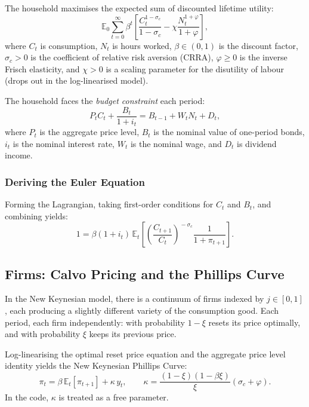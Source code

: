 \documentclass[11pt,a4paper]{article}
\theoremstyle{definition}
\newcommand{\E}{\mathbb{E}}
\begin{document}
	The household maximises the expected sum of discounted lifetime utility:
	\begin{equation}\label{eq:utility}
		\E_0 \sum_{t=0}^{\infty} \beta^t \left[\frac{C_t^{1 - \sigma_c}}{1 - \sigma_c} - \chi \frac{N_t^{1 + \varphi}}{1 + \varphi}\right],
	\end{equation}
	where $C_t$ is consumption, $N_t$ is hours worked, $\beta \in (0,1)$ is the discount factor, $\sigma_c > 0$ is the coefficient of relative risk aversion (CRRA), $\varphi \geq 0$ is the inverse Frisch elasticity, and $\chi > 0$ is a scaling parameter for the disutility of labour (drops out in the log-linearised model).
	
	The household faces the \emph{budget constraint} each period:
	\begin{equation}\label{eq:budget}
		P_t C_t + \frac{B_t}{1 + i_t} = B_{t-1} + W_t N_t + D_t,
	\end{equation}
	where $P_t$ is the aggregate price level, $B_t$ is the nominal value of one-period bonds, $i_t$ is the nominal interest rate, $W_t$ is the nominal wage, and $D_t$ is dividend income.
	
	\subsubsection{Deriving the Euler Equation}
	
	Forming the Lagrangian, taking first-order conditions for $C_t$ and $B_t$, and combining yields:
	\begin{equation}\label{eq:euler_pi}
		1 = \beta(1+i_t) \, \E_t\!\left[\left(\frac{C_{t+1}}{C_t}\right)^{\!-\sigma_c} \frac{1}{1+\pi_{t+1}}\right].
	\end{equation}
	
	\subsection{Firms: Calvo Pricing and the Phillips Curve}
	\label{sec:firms}
	
	In the New Keynesian model, there is a continuum of firms indexed by $j \in [0,1]$, each producing a slightly different variety of the consumption good.
	Each period, each firm independently: with probability $1 - \xi$ resets its price optimally, and with probability $\xi$ keeps its previous price.
	
	Log-linearising the optimal reset price equation and the aggregate price level identity yields the New Keynesian Phillips Curve:
	\begin{equation}\label{eq:nkpc_micro}
		\pi_t = \beta \, \E_t[\pi_{t+1}] + \kappa \, y_t, \qquad \kappa = \frac{(1-\xi)(1-\beta\xi)}{\xi}(\sigma_c + \varphi).
	\end{equation}
	In the code, $\kappa$ is treated as a free parameter.
	
\end{document}
